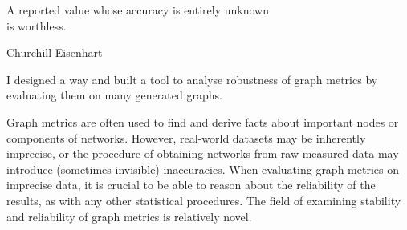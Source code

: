 \epigraph{A reported value whose accuracy is entirely unknown\\ is worthless.}{Churchill Eisenhart~\cite{EisenhartExpressionUncertaintiesFinal1968}}

%
%


I designed a way and built a tool to analyse robustness of graph metrics by evaluating them on many generated graphs.

Graph metrics are often used to find and derive facts about important nodes or components of networks.
However, real-world datasets may be inherently imprecise, or the procedure of obtaining networks from raw measured data may introduce (sometimes invisible) inaccuracies.
When evaluating graph metrics on imprecise data, it is crucial to be able to reason about the reliability of the results, as with any other statistical procedures.
The field of examining stability and reliability of graph metrics is relatively novel.

